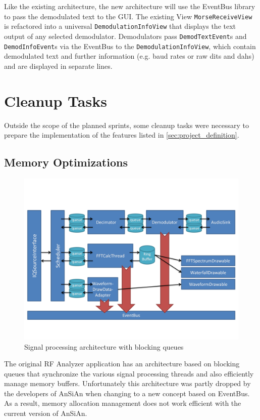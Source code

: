 Like the existing architecture, the new architecture will use the EventBus
library to pass the demodulated text to the \ac{GUI}. The existing View
\texttt{MorseReceiveView} is refactored into a universal
\texttt{De\-mo\-du\-la\-tion\-In\-fo\-View} that displays the text output of any selected 
demodulator. Demodulators pass \texttt{DemodTextEvent}s and 
\texttt{DemodInfoEvent}s via the EventBus to the \texttt{De\-mo\-du\-la\-tion\-In\-fo\-View}, 
which contain demodulated text and further information (e.g. baud rates or raw 
dits and dahs) and are displayed in separate lines.

\section{Cleanup Tasks\label{sec:cleanup}}

Outside the scope of the planned sprints, some cleanup tasks were necessary
to prepare the implementation of the features listed in
\autoref{sec:project_definition}.

\subsection{Memory Optimizations\label{sec:cleanup.mem}}

\begin{figure}
	\centering
	\includegraphics[width=1\linewidth]{gfx/queue_arch}
	\caption{Signal processing architecture with blocking queues}
	\label{fig:queue_architecture}
\end{figure}

The original RF Analyzer application has an architecture based on
blocking queues that synchronize the various signal processing threads
and also efficiently manage memory buffers. Unfortunately this
architecture was partly dropped by the developers of AnSiAn when
changing to a new concept based on EventBus. As a result, memory
allocation management does not work efficient with the current version
of AnSiAn.

